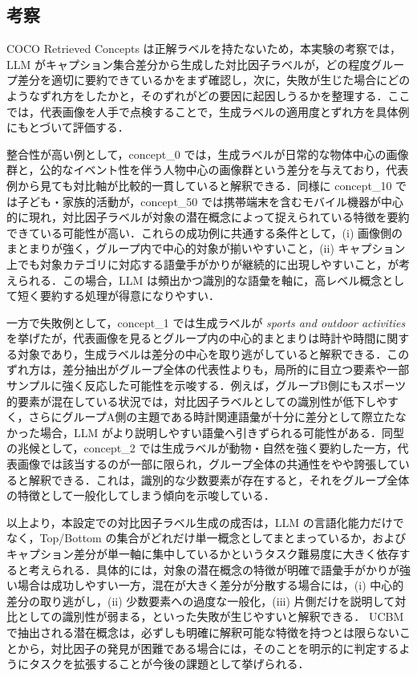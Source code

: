 \subsection{考察}
COCO Retrieved Concepts は正解ラベルを持たないため，本実験の考察では，LLM がキャプション集合差分から生成した対比因子ラベルが，どの程度グループ差分を適切に要約できているかをまず確認し，次に，失敗が生じた場合にどのようなずれ方をしたかと，そのずれがどの要因に起因しうるかを整理する．ここでは，代表画像を人手で点検することで，生成ラベルの適用度とずれ方を具体例にもとづいて評価する．

整合性が高い例として，concept\_0 では，生成ラベルが日常的な物体中心の画像群と，公的なイベント性を伴う人物中心の画像群という差分を与えており，代表例から見ても対比軸が比較的一貫していると解釈できる．同様に concept\_10 では子ども・家族的活動が，concept\_50 では携帯端末を含むモバイル機器が中心的に現れ，対比因子ラベルが対象の潜在概念によって捉えられている特徴を要約できている可能性が高い．これらの成功例に共通する条件として，(i) 画像側のまとまりが強く，グループ内で中心的対象が揃いやすいこと，(ii) キャプション上でも対象カテゴリに対応する語彙手がかりが継続的に出現しやすいこと，が考えられる．この場合，LLM は頻出かつ識別的な語彙を軸に，高レベル概念として短く要約する処理が得意になりやすい．

一方で失敗例として，concept\_1 では生成ラベルが \textit{sports and outdoor activities} を挙げたが，代表画像を見るとグループ内の中心的まとまりは時計や時間に関する対象であり，生成ラベルは差分の中心を取り逃がしていると解釈できる．このずれ方は，差分抽出がグループ全体の代表性よりも，局所的に目立つ要素や一部サンプルに強く反応した可能性を示唆する．例えば，グループB側にもスポーツ的要素が混在している状況では，対比因子ラベルとしての識別性が低下しやすく，さらにグループA側の主題である時計関連語彙が十分に差分として際立たなかった場合，LLM がより説明しやすい語彙へ引きずられる可能性がある．同型の兆候として，concept\_2 では生成ラベルが動物・自然を強く要約した一方，代表画像では該当するのが一部に限られ，グループ全体の共通性をやや誇張していると解釈できる．これは，識別的な少数要素が存在すると，それをグループ全体の特徴として一般化してしまう傾向を示唆している．

以上より，本設定での対比因子ラベル生成の成否は，LLM の言語化能力だけでなく，Top/Bottom の集合がどれだけ単一概念としてまとまっているか，およびキャプション差分が単一軸に集中しているかというタスク難易度に大きく依存すると考えられる．具体的には，対象の潜在概念の特徴が明確で語彙手がかりが強い場合は成功しやすい一方，混在が大きく差分が分散する場合には，(i) 中心的差分の取り逃がし，(ii) 少数要素への過度な一般化，(iii) 片側だけを説明して対比としての識別性が弱まる，といった失敗が生じやすいと解釈できる．
UCBMで抽出される潜在概念は，必ずしも明確に解釈可能な特徴を持つとは限らないことから，対比因子の発見が困難である場合には，そのことを明示的に判定するようにタスクを拡張することが今後の課題として挙げられる．
